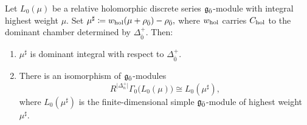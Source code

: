 \begin{proposition}
\label{prop::Zuckerman_even_discrete_series}
Let $L_0(\mu)$ be a relative holomorphic discrete series
${\mathfrak{g}_{\bar{0}}}$-module with integral highest weight $\mu$.
Set
$
\mu^\sharp
\coloneqq
w_{\operatorname{hol}}(\mu+\rho_{\bar0})-\rho_{\bar0},
$
where $w_{\operatorname{hol}}$ carries $C_{\operatorname{hol}}$ to the dominant
chamber determined by $\Delta_{\bar0}^+$.
Then:
\begin{enumerate}
    \item[(a)]
    $\mu^\sharp$ is dominant integral with respect to
    $\Delta_{\bar0}^+$.

    \item[(b)]
    There is an isomorphism of ${\mathfrak{g}_{\bar{0}}}$-modules
    \[
    R^{\vert \Delta_{n}^{+}\vert} \Gamma_0\bigl(L_0(\mu)\bigr)
    \cong
    L_0(\mu^\sharp),
    \]
    where $L_0(\mu^\sharp)$ is the finite-dimensional
    simple ${\mathfrak{g}_{\bar{0}}}$-module of highest weight $\mu^\sharp$.
\end{enumerate}
\end{proposition}

